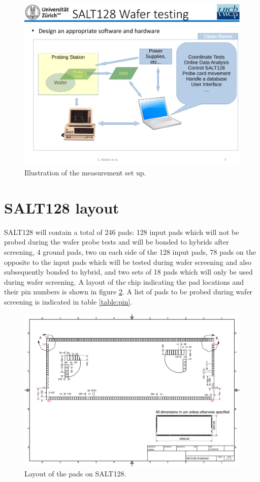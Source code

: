 \documentclass{lhcbnote}
\begin{document}
\begin{figure}
\centering
\includegraphics[width=\textwidth]{figures/test_sum}
\caption{Illustration of the measurement set up.}
\label{fig:test_sum}
\end{figure}


\section{SALT128 layout}

SALT128 will contain a total of 246 pads: 128 input pads which will not be probed during the wafer probe tests and will be bonded to hybrids after screening, 4 ground pads, two on each side of the 128 input pads, 78 pads on the opposite to the input pads which will be tested during wafer screening and also subsequently bonded to hybrid, and two sets of 18 pads which will only be used during wafer screening. A layout of the chip indicating the pad locations and their pin numbers is shown in figure \ref{fig:pads}. A list of pads to be probed during wafer screening is indicated in table \ref{table:pin}.

\begin{figure}
\centering
\includegraphics[width=\textwidth]{figures/SALT128_ProbeCard}
\caption{Layout of the pads on SALT128.}
\label{fig:pads}
\end{figure}
\end{document}
